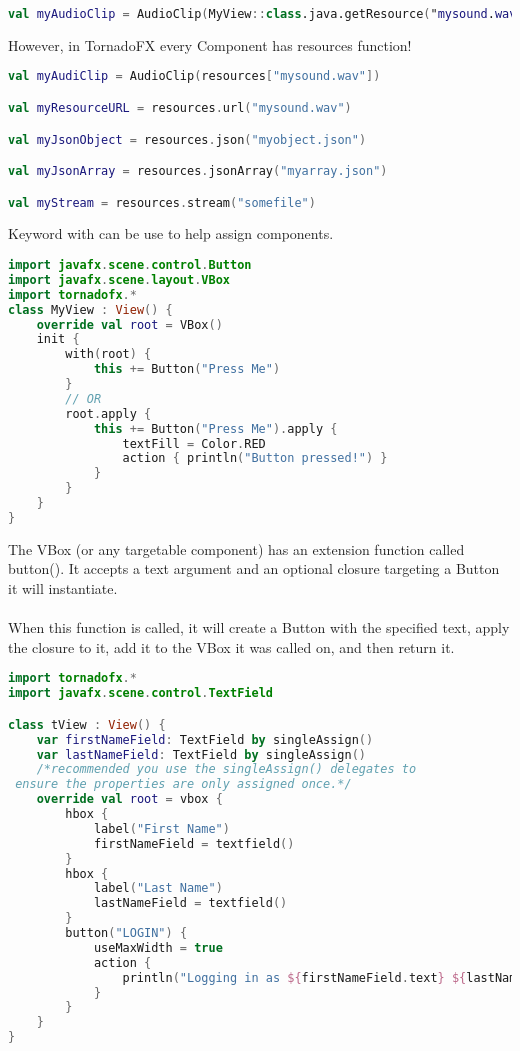 \documentclass[12pt]{article}
\begin{document}
\begin{lstlisting}[language=Kotlin]
val myAudioClip = AudioClip(MyView::class.java.getResource("mysound.wav").toExternalForm())
\end{lstlisting}
However, in TornadoFX every Component has resources function!
\begin{lstlisting}[language=Kotlin]
val myAudiClip = AudioClip(resources["mysound.wav"])

val myResourceURL = resources.url("mysound.wav")

val myJsonObject = resources.json("myobject.json")

val myJsonArray = resources.jsonArray("myarray.json")

val myStream = resources.stream("somefile")
\end{lstlisting}
Keyword with can be use to help assign components.
\begin{lstlisting}[language=Kotlin]
import javafx.scene.control.Button
import javafx.scene.layout.VBox
import tornadofx.*
class MyView : View() {
    override val root = VBox()
    init {
        with(root) {
            this += Button("Press Me")
        }
        // OR
        root.apply {
			this += Button("Press Me").apply {
                textFill = Color.RED
                action { println("Button pressed!") }
            }
		}
    }
}
\end{lstlisting}
The VBox (or any targetable component) has an extension
function called button(). It accepts a text argument and an optional closure targeting a Button it will instantiate.\\\\
When this function is called, it will create a Button with the specified text, apply the closure to it, add it to the VBox it was called on, and then return it.
\begin{lstlisting}[language=Kotlin]
import tornadofx.*
import javafx.scene.control.TextField

class tView : View() {
    var firstNameField: TextField by singleAssign()
    var lastNameField: TextField by singleAssign() 
    /*recommended you use the singleAssign() delegates to
 ensure the properties are only assigned once.*/
    override val root = vbox {
        hbox {
            label("First Name")
            firstNameField = textfield()
        }
        hbox {
            label("Last Name")
            lastNameField = textfield()
        }
        button("LOGIN") {
            useMaxWidth = true
            action {
                println("Logging in as ${firstNameField.text} ${lastNameField.text}")
            }
        }
    }
}
\end{lstlisting}
\end{document}
